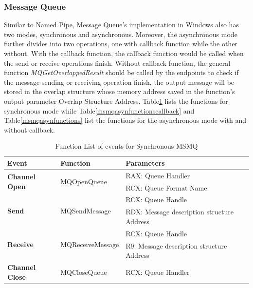 \subsubsection{Message Queue}
Similar to Named Pipe, Message Queue's implementation in Windows also has two modes, synchronous and asynchronous. Moreover, the asynchronous mode further divides into two operations, one with callback function while the other without. With the callback function, the callback function would be called when the send or receive operations finish. Without callback function, the general function \textit{MQGetOverlappedResult} should be called by the endpoints to check if the message sending or receiving operation finish, the output message will be stored in the overlap structure whose memory address saved in the function's output parameter Overlap Structure Address. Table\ref{msmqsynfunctions} lists the functions for synchronous mode while Table\ref{msmqasynfunctionscallback} and Table\ref{msmqasynfunctions} list the functions for the asynchronous mode with and without callback. 

    \begin{table}[H]
        \centering
        \caption{Function List  of events for Synchronous MSMQ}
        \label{msmqsynfunctions}
        \begin{tabular}{|l|l|l|}
            \hline
             \textbf{Event} & \textbf{Function}& \textbf{Parameters}  \\
             \hline
             \multirow{2}{*}{{\textbf{Channel Open}}}
             &\multirow{2}{*}{{MQOpenQueue}} &  RAX: Queue Handler\\
              \cline{3-3} 
             & &  RCX: Queue Format Name\\
            \hline
             \multirow{2}{*}{{\textbf{Send}}}
             &\multirow{2}{*}{MQSendMessage} &  RCX: Queue Handle \\
              \cline{3-3} 
             &&  RDX: Message description structure Address \\
            \hline
             \multirow{2}{*}{{\textbf{Receive}}}
             & \multirow{2}{*}{MQReceiveMessage}&  RCX: Queue Handle \\
              \cline{3-3} 
              &&  R9: Message description structure Address \\
            \hline
            \textbf{Channel Close} &MQCloseQueue & RCX: Queue Handler \\
            \hline
        \end{tabular}
    \end{table}



